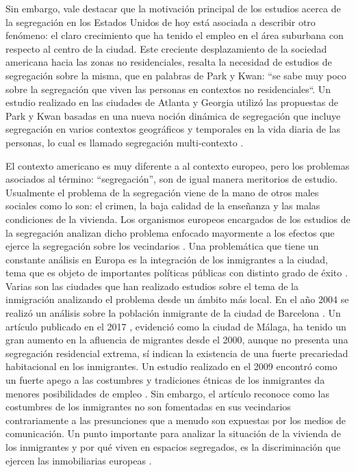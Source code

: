 Sin embargo, vale destacar que la motivación principal de los estudios acerca de la segregación en los 
Estados Unidos de hoy está asociada a describir otro fenómeno: el claro crecimiento que ha tenido el empleo 
en el área suburbana con respecto al centro de la ciudad. Este creciente desplazamiento de la sociedad americana hacia las zonas no residenciales, resalta la necesidad de estudios de segregación sobre la misma, 
que en palabras de Park y Kwan: “se sabe muy poco sobre la segregación que viven las personas en contextos no 
residenciales“. Un estudio realizado en las ciudades de Atlanta y Georgia utilizó las propuestas de Park y 
Kwan basadas en una nueva noción dinámica de segregación que incluye segregación en varios contextos 
geográficos y temporales en la vida diaria de las personas, lo cual es llamado segregación multi-contexto \cite{Park2018BeyondRS}.


El contexto americano es muy diferente a al contexto europeo, pero los problemas asociados al término: “segregación”, son de igual manera meritorios de estudio. Usualmente el problema de la segregación viene de la mano de otros males sociales como lo son: el crimen, la baja calidad de la enseñanza y las malas condiciones de la vivienda. Los organismos europeos encargados de los estudios de la segregación analizan dicho problema enfocado mayormente a los efectos que ejerce la segregación sobre los vecindarios \cite{Musterd2005HousingMS}. Una problemática que tiene un constante análisis en Europa es la integración de los inmigrantes a la ciudad, tema que es objeto de importantes políticas públicas con distinto grado de éxito \cite{Alonso2008METODOLOGAPE}. Varias son las ciudades que han realizado estudios sobre el tema de la inmigración analizando el problema desde un ámbito más local. 
En el año 2004 se realizó un análisis sobre la población inmigrante de la ciudad de Barcelona \cite{Caas2004IndicadoresCD}. Un artículo publicado en el 2017 \cite{NateraRivas2017EvidenciasSL}, evidenció como la ciudad de Málaga, ha tenido un gran aumento en la afluencia de migrantes desde el 2000, aunque no presenta una segregación residencial extrema, sí indican la existencia de una fuerte precariedad habitacional en los inmigrantes. Un estudio realizado en el 2009 encontró como un fuerte apego a las costumbres y tradiciones étnicas de los inmigrantes da menores posibilidades de empleo \cite{Bisin2009EthnicI}. Sin embargo, el artículo reconoce como las costumbres de los inmigrantes no son fomentadas en sus vecindarios contrariamente a las presunciones que a menudo son expuestas por los medios de comunicación. Un punto importante para analizar la situación de la vivienda de los inmigrantes y por qué viven en espacios segregados, es la discriminación que ejercen las inmobiliarias europeas \cite{Dill2011ResidentialSA}.


